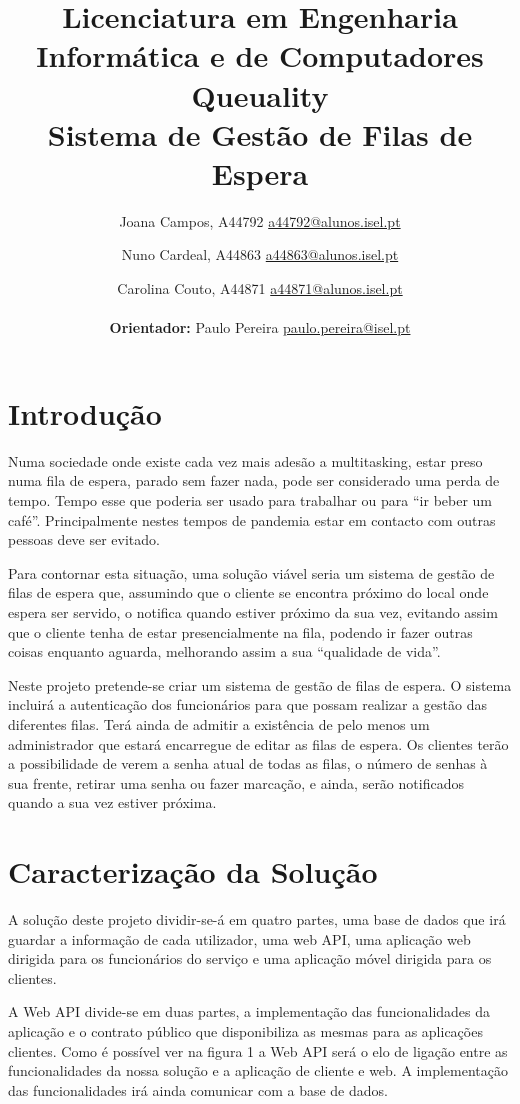 \documentclass[12pt,a4paper]{article}
\title{
    \textbf{Licenciatura em Engenharia Informática e de Computadores} \vspace{5mm} \\
    \textbf{Queuality} \\ 
    Sistema de Gestão de Filas de Espera
}
\author{
    Joana Campos, A44792 \href{mailto:a44792@alunos.isel.pt}{a44792@alunos.isel.pt} 
    \and Nuno Cardeal, A44863 \href{mailto:a44863@alunos.isel.pt}{a44863@alunos.isel.pt}
    \and Carolina Couto, A44871 \href{mailto:a44871@alunos.isel.pt}{a44871@alunos.isel.pt} \\
    \\
    \textbf{Orientador:} Paulo Pereira \href{mailto:paulo.pereira@isel.pt}{paulo.pereira@isel.pt}
}
\begin{document}
\maketitle
\pagebreak
\tableofcontents
\thispagestyle{empty}
\listoffigures
\newpage
{}


\pagebreak
\section{Introdução}
Numa sociedade onde existe cada vez mais adesão a multitasking, estar preso numa fila de espera,
parado sem fazer nada, pode ser considerado uma perda de tempo. Tempo esse que poderia ser usado
para trabalhar ou para “ir beber um café”. Principalmente nestes tempos de pandemia estar em contacto
com outras pessoas deve ser evitado.\par

Para contornar esta situação, uma solução viável seria um sistema de gestão de filas de espera que,
assumindo que o cliente se encontra próximo do local onde espera ser servido, o notifica quando estiver
próximo da sua vez, evitando assim que o cliente tenha de estar presencialmente na fila, podendo ir
fazer outras coisas enquanto aguarda, melhorando assim a sua “qualidade de vida”.\par

Neste projeto pretende-se criar um sistema de gestão de filas de espera. O sistema incluirá a
autenticação dos funcionários para que possam realizar a gestão das diferentes filas. Terá ainda de
admitir a existência de pelo menos um administrador que estará encarregue de editar as filas de espera.
Os clientes terão a possibilidade de verem a senha atual de todas as filas, o número de senhas à sua
frente, retirar uma senha ou fazer marcação, e ainda, serão notificados quando a sua vez estiver próxima.\par 

\pagebreak
\section{Caracterização da Solução}
A solução deste projeto dividir-se-á em quatro partes, uma base de dados que irá guardar a
informação de cada utilizador, uma web API, uma aplicação web dirigida para os funcionários do
serviço e uma aplicação móvel dirigida para os clientes. 

A Web API divide-se em duas partes, a implementação das funcionalidades da aplicação e o
contrato público que disponibiliza as mesmas para as aplicações clientes. Como é possível ver na figura
1 a Web API será o elo de ligação entre as funcionalidades da nossa solução e a aplicação de cliente e
web. A implementação das funcionalidades irá ainda comunicar com a base de dados.
\end{document}

